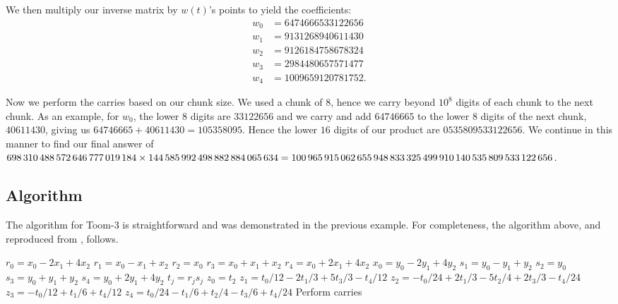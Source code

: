 \documentclass[psamsfonts,reqno]{amsart}
\theoremstyle{definition}
\theoremstyle{remark}
\numberwithin{equation}{section}
\begin{document}
We then multiply our inverse matrix by $w(t)$'s points to yield the coefficients:
\begin{align*}
	w_0 &= \num{6474666533122656} \\
	w_1 &= \num{9131268940611430} \\
	w_2 &= \num{9126184758678324} \\
	w_3 &= \num{2984480657571477} \\
	w_4 &= \num{1009659120781752}.
\end{align*}

Now we perform the carries based on our chunk size. We used a chunk of $8$, hence we carry beyond $10^8$ digits of each chunk to the next chunk. As an example, for $w_0$, the lower 8 digits are $\num{33122656}$ and we carry and add $\num{64746665}$ to the lower $8$ digits of the next chunk, $\num{40611430}$, giving us $\num{64746665} + \num{40611430} = \num{105358095}$. Hence the lower $16$ digits of our product are $\num{0535809533122656}$. We continue in this manner to find our final answer of $\num{698310488572646777019184} \times \num{144585992498882884065634} =\\ 
\num{100965915062655948833325499910140535809533122656}$.

\subsection{Algorithm \nopunct}

The algorithm for Toom-3 is straightforward and was demonstrated in the previous example. For completeness, the algorithm above, and reproduced from \cite{crandall2005prime}, follows.

\begin{algorithm}
	\caption{Toom-3}
	\label{toom-3}
	\begin{algorithmic}
		\State $r_0 = x_0 - 2x_1 + 4x_2$
		\State $r_1 = x_0 - x_1 + x_2$
		\State $r_2 = x_0$
		\State $r_3 = x_0 + x_1 + x_2$
		\State $r_4 = x_0 + 2x_1 + 4x_2$
		\State $x_0 = y_0 - 2y_1 + 4y_2$
		\State $s_1 = y_0 - y_1 + y_2$
		\State $s_2 = y_0$
		\State $s_3 = y_0 + y_1 + y_2$
		\State $s_4 = y_0 + 2y_1 + 4y_2$
			\State $t_j = r_j s_j$
		\EndFor
		\State $z_0 = t_2$
		\State $z_1 = t_0/12 - 2t_1/3 + 5t_3/3-t_4/12$
		\State $z_2 = -t_0/24 + 2t_1/3 - 5t_2/4 + 2t_3/3 - t_4/24$
		\State $z_3 = -t_0/12 + t_1/6 + t_4/12$
		\State $z_4 = t_0/24 - t_1/6 + t_2/4 -t_3/6 + t_4/24$
		\State Perform carries
		\State {}
	\end{algorithmic}
\end{algorithm}
\end{document}
